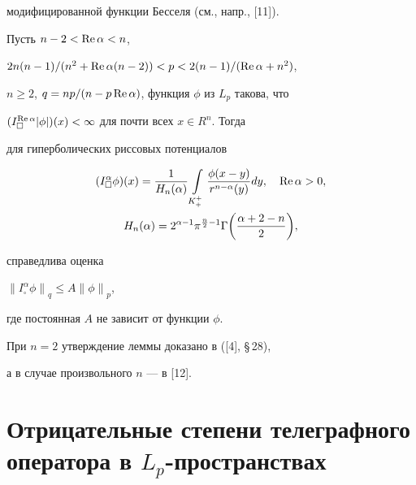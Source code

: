 модифицированной функции Бесселя (см., напр., [11]).








\begin{lem}


Пусть $n-2< \operatorname{Re}\alpha<n$,


$2n(n-1)/(n^2+\operatorname{Re}\alpha(n-2))<p<2(n-1)/(\operatorname{Re}\alpha+n^2)$,


$n\geq 2$, $q=np/(n-p\operatorname{Re}\alpha)$, функция $\phi$ из $L_p$ такова, что


$(I_{\square}^{\operatorname{Re}\alpha}|\phi|)(x)<\infty$ для почти всех $x\in R^n$. Тогда


для гиперболических риссовых потенциалов


\begin{gather*}


(I_{\square}^{\alpha}\phi)(x)=\frac{1}{H_n(\alpha)}\int\limits_{K_+^+}\frac


{\phi(x-y)}{r^{n-\alpha}(y)}dy,\quad \R\alpha>0,\\


%


H_n(\alpha)=2^{\alpha-1}{\pi}^{\frac{n}{2}-1}


\Gamma\bigg(\frac{\alpha+2-n}{2}\bigg),


\end{gather*}


справедлива оценка


${\|I_{\square}^{\alpha}\phi\|}_q \leq A{\|\phi\|}_p$,


где постоянная $A$ не зависит от функции $\phi$.


\end{lem}





При $n=2$ утверждение леммы доказано в ([4], \S\,28),


а в случае произвольного $n$ --- в [12].








\section{Отрицательные степени телеграфного оператора в $L_p$-пространствах}





